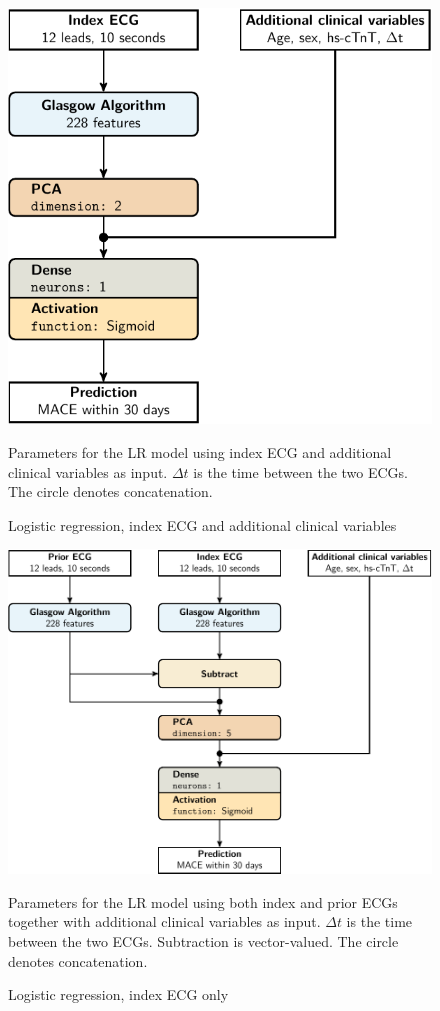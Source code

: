 \documentclass[preprint]{elsarticle}
\begin{document}
\begin{figure}[H]
\centering
\includegraphics[scale=\modelscale,keepaspectratio,trim=-16em 0 0 0]{figures/model-lr3.pdf}
\caption{Logistic regression, index ECG and additional clinical variables}
\medskip
\small
Parameters for the LR model using index ECG and additional clinical variables as input. $\Delta t$ is the time between the two ECGs. The circle denotes concatenation. 
\end{figure}

\begin{figure}[H]
\centering
\includegraphics[scale=\modelscale,keepaspectratio]{figures/model-lr4.pdf}
\caption{Logistic regression, index ECG only}
\medskip
\small
Parameters for the LR model using both index and prior ECGs together with additional clinical variables as input. $\Delta t$ is the time between the two ECGs. Subtraction is vector-valued. The circle denotes concatenation. 
\end{figure}
\end{document}
